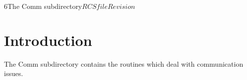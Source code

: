 %   

\begin{cactuspart}{6}{The Comm subdirectory}{$RCSfile$}{$Revision$}
\renewcommand{\thepage}{\Alph{part}\arabic{page}}

\chapter{Introduction}

The Comm subdirectory contains the routines which deal with communication issues.

\end{cactuspart}
